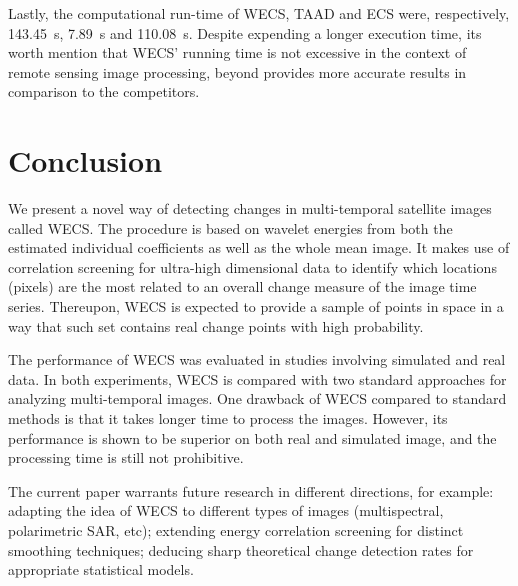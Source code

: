 \documentclass[journal]{IEEEtran}
\begin{document}
Lastly, the computational run-time of WECS, TAAD and ECS were, respectively, \SI{143.45}{\second}, \SI{7.89}{\second} and \SI{110.08}{\second}. Despite expending a longer execution time, its worth mention that WECS' running time is not excessive in the context of remote sensing image processing, beyond provides more accurate results in comparison to the competitors.




\section{Conclusion}\label{section_discussion}


We present a novel way of detecting changes in multi-temporal satellite images called WECS. The procedure is based on wavelet energies from both the estimated individual coefficients as well as the whole mean image. It makes use of correlation screening for ultra-high dimensional data to identify which locations (pixels) are the most related to an overall change measure of the image time series. Thereupon, WECS is expected to provide a sample of points in space in a way that such set contains real change points with high probability. 

The performance of WECS was evaluated in studies involving simulated and real data. In both experiments, WECS is compared with two standard approaches for analyzing multi-temporal images. One drawback of WECS compared to standard methods is that it takes longer time to process the images. However, its performance is shown to be superior on both real and simulated image, and the processing time is still not prohibitive.

The current paper warrants future research in different directions, for example: adapting the idea of WECS to different types of images (multispectral, polarimetric SAR, etc); extending energy correlation screening for distinct smoothing techniques; deducing sharp theoretical change detection rates for appropriate statistical models.




\end{document}
